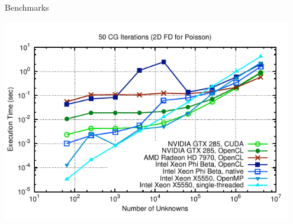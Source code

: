 






\begin{frame}{Benchmarks}
  \begin{center}
   \includegraphics[width=0.95\textwidth]{figures/cg-timings-7}
  \end{center}
\end{frame}


